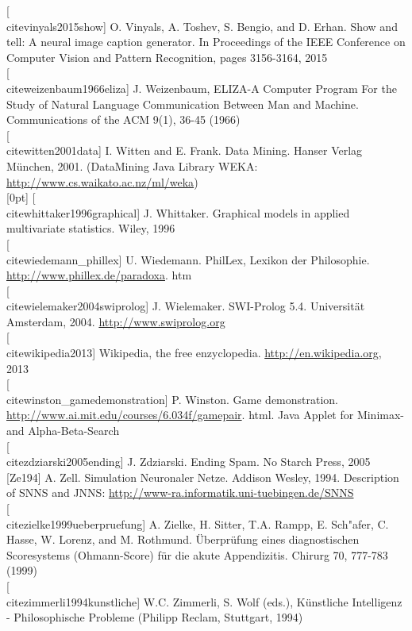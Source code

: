 \documentclass[10pt]{book}
\begin{document}
[\\cite{vinyals2015show}] O. Vinyals, A. Toshev, S. Bengio, and D. Erhan. Show and tell: A neural image caption generator. In Proceedings of the IEEE Conference on Computer Vision and Pattern Recognition, pages 3156-3164, 2015\\[0pt]
[\\cite{weizenbaum1966eliza}] J. Weizenbaum, ELIZA-A Computer Program For the Study of Natural Language Communication Between Man and Machine. Communications of the ACM 9(1), 36-45 (1966)\\[0pt]
[\\cite{witten2001data}] I. Witten and E. Frank. Data Mining. Hanser Verlag München, 2001. (DataMining Java Library WEKA: \href{http://www.cs.waikato.ac.nz/ml/weka}{http://www.cs.waikato.ac.nz/ml/weka})\\
[0pt]
[\\cite{whittaker1996graphical}] J. Whittaker. Graphical models in applied multivariate statistics. Wiley, 1996\\[0pt]
[\\cite{wiedemann_phillex}] U. Wiedemann. PhilLex, Lexikon der Philosophie. \href{http://www.phillex.de/paradoxa}{http://www.phillex.de/paradoxa}. htm\\[0pt]
[\\cite{wielemaker2004swiprolog}] J. Wielemaker. SWI-Prolog 5.4. Universität Amsterdam, 2004. \href{http://www.swiprolog.org}{http://www.swiprolog.org}\\[0pt]
[\\cite{wikipedia2013}] Wikipedia, the free enzyclopedia. \href{http://en.wikipedia.org}{http://en.wikipedia.org}, 2013\\[0pt]
[\\cite{winston_gamedemonstration}] P. Winston. Game demonstration. \href{http://www.ai.mit.edu/courses/6.034f/gamepair}{http://www.ai.mit.edu/courses/6.034f/gamepair}. html. Java Applet for Minimax- and Alpha-Beta-Search\\[0pt]
[\\cite{zdziarski2005ending}] J. Zdziarski. Ending Spam. No Starch Press, 2005\\[0pt]
[Ze194] A. Zell. Simulation Neuronaler Netze. Addison Wesley, 1994. Description of SNNS and JNNS: \href{http://www-ra.informatik.uni-tuebingen.de/SNNS}{http://www-ra.informatik.uni-tuebingen.de/SNNS}\\[0pt]
[\\cite{zielke1999ueberpruefung}] A. Zielke, H. Sitter, T.A. Rampp, E. Sch"afer, C. Hasse, W. Lorenz, and M. Rothmund. Überprüfung eines diagnostischen Scoresystems (Ohmann-Score) für die akute Appendizitis. Chirurg 70, 777-783 (1999)\\[0pt]
[\\cite{zimmerli1994kunstliche}] W.C. Zimmerli, S. Wolf (eds.), Künstliche Intelligenz - Philosophische Probleme (Philipp Reclam, Stuttgart, 1994)
\end{document}

